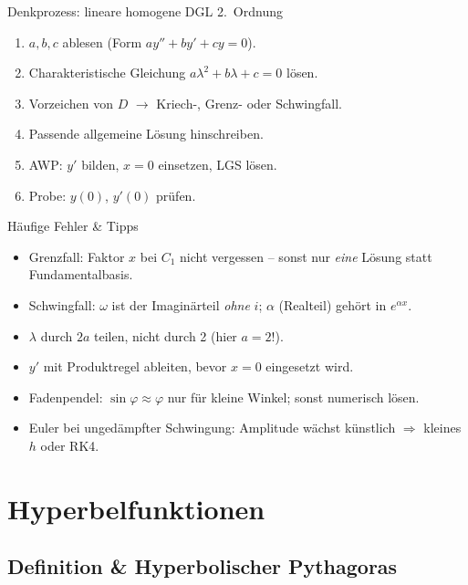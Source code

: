 \documentclass[a4paper, fontsize=7pt]{scrartcl}
\begin{document}
\begin{subbox}{Denkprozess: lineare homogene DGL 2.\ Ordnung}
\begin{enumerate}
    \item $a, b, c$ ablesen (Form $ay'' + by' + cy = 0$).
    \item Charakteristische Gleichung $a\lambda^2 + b\lambda + c = 0$
          lösen.
    \item Vorzeichen von $D$ $\to$ Kriech-, Grenz- oder Schwingfall.
    \item Passende allgemeine Lösung hinschreiben.
    \item AWP: $y'$ bilden, $x = 0$ einsetzen, LGS lösen.
    \item Probe: $y(0)$, $y'(0)$ prüfen.
\end{enumerate}
\end{subbox}

\begin{subbox}{Häufige Fehler \& Tipps}
\begin{itemize}
    \item Grenzfall: Faktor $x$ bei $C_1$ nicht vergessen -- sonst nur
          \emph{eine} Lösung statt Fundamentalbasis.
    \item Schwingfall: $\omega$ ist der Imaginärteil \emph{ohne} $i$;
          $\alpha$ (Realteil) gehört in $e^{\alpha x}$.
    \item $\lambda$ durch $2a$ teilen, nicht durch 2 (hier $a = 2$!).
    \item $y'$ mit Produktregel ableiten, bevor $x = 0$ eingesetzt wird.
    \item Fadenpendel: $\sin\varphi \approx \varphi$ nur für kleine
          Winkel; sonst numerisch lösen.
    \item Euler bei ungedämpfter Schwingung: Amplitude wächst
          künstlich $\Rightarrow$ kleines $h$ oder RK4.
\end{itemize}
\end{subbox}

\section{Hyperbelfunktionen}

\subsection{Definition \& Hyperbolischer Pythagoras}
\end{document}
